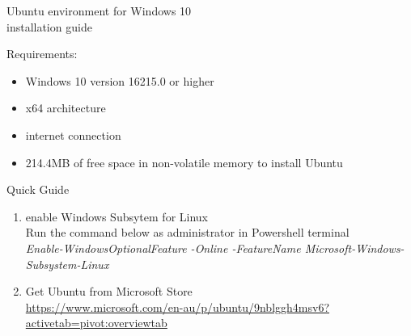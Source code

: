\documentclass[10pt,a4paper]{article}
\begin{document}
\begin{LARGE}
\begin{center}
Ubuntu environment for Windows 10\\
installation guide
\end{center}
\end{LARGE}
\vspace{2cm}
\large Requirements:\\
\begin{itemize}
\normalsize
\item Windows 10 version 16215.0 or higher
\item x64 architecture 
\item internet connection
\item 214.4MB of free space in non-volatile memory to install Ubuntu
\end{itemize} \vspace{1cm}
\large Quick Guide
\normalsize
\begin{enumerate}
\item enable Windows Subsytem for Linux\\
Run the command below as administrator in Powershell terminal\\
\textit{Enable-WindowsOptionalFeature -Online -FeatureName Microsoft-Windows-Subsystem-Linux}
\item Get Ubuntu from Microsoft Store\\
\url{https://www.microsoft.com/en-au/p/ubuntu/9nblggh4msv6?activetab=pivot:overviewtab}
\end{enumerate}
\end{document}
